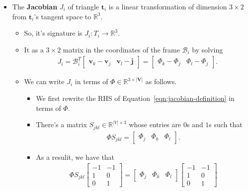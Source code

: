 \documentclass[10pt]{article}
\newcommand{\ve}[1]{\mathbf{#1}}
\newcommand{\ra}{\rightarrow}
\newcommand{\mcal}[1]{\mathcal{#1}}
\newcommand{\Real}{\mathbb{R}}
\begin{document}
\begin{itemize}
    \item The {\bf Jacobian} $J_i$ of triangle $\ve{t}_i$ is a linear transformation of dimension $3 \times 2$ from $\ve{t}_i$'s tangent space to $\Real^3$.
    \begin{itemize}
        \item So, it's signature is $J_i: T_i \ra \Real^3$.
        \item It as a $3 \times 2$ matrix in the coordinates of the frame $\mcal{B}_i$ by solving
        \begin{align}
            J_i = \mcal{B}_i^T \begin{bmatrix}
                \ve{v}_k - \ve{v}_j & \ve{v}_l - \ve{j}
            \end{bmatrix}
            = \begin{bmatrix}
                \Phi_k - \Phi_j & \Phi_l - \Phi_j
            \end{bmatrix}. \label{eqn:jacobian-definition}
        \end{align}
        \item We can write $J_i$ in terms of $\Phi \in \Real^{3 \times |\ve{V}|}$ as follows.
        \begin{itemize}
            \item We first rewrite the RHS of Equation~\eqref{eqn:jacobian-definition} in terms of $\Phi$.
            \item There's a matrix $S_{jkl} \in \Real^{|V| \times 3}$ whose entries are $0$s and $1$s such that
            \begin{align*}
                \Phi S_{jkl} = \begin{bmatrix} \Phi_j & \Phi_k & \Phi_l \end{bmatrix}.
            \end{align*}
            \item As a resulit, we have that
            \begin{align*}
                \Phi S_{jkl} \begin{bmatrix} -1 & -1 \\ 1 & 0 \\ 0 & 1 \end{bmatrix} 
                = \begin{bmatrix} \Phi_j & \Phi_k & \Phi_l \end{bmatrix} \begin{bmatrix} -1 & -1 \\ 1 & 0 \\ 0 & 1 \end{bmatrix}

\end{align*}
\end{itemize}
\end{itemize}
\end{itemize}
\end{document}
